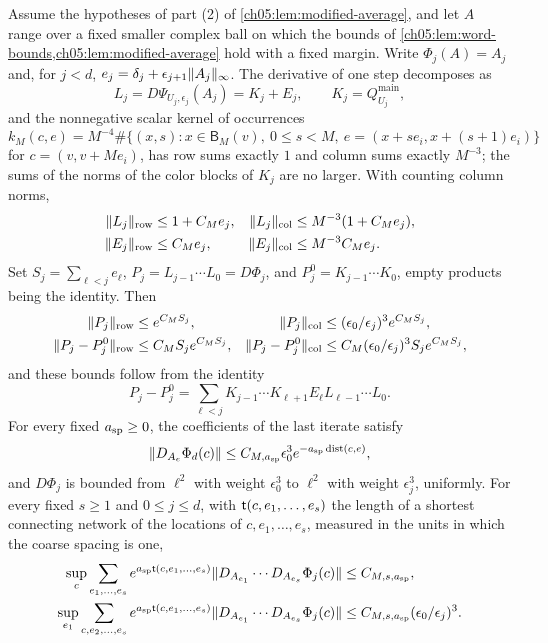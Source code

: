 \begin{lemma}\label{ch05:lem:physical-jets}
Assume the hypotheses of part (2) of \cref{ch05:lem:modified-average}, and let $A$ range over a fixed smaller complex ball on which the bounds of \cref{ch05:lem:word-bounds,ch05:lem:modified-average} hold with a fixed margin. Write $\Phi_j(A)=A_j$ and, for $j<d$, $e_j=\delta_j+\epsilon_{j+1}\lVert A_j\rVert_\infty$. The derivative of one step decomposes as
\[
 L_j=D\Psi_{U_j,\epsilon_j}(A_j)=K_j+E_j,\qquad K_j=Q^{\mathrm{main}}_{U_j},
\]
and the nonnegative scalar kernel of occurrences
\[
 k_M(c,e)=M^{-4}\#\bigl\{(x,s):x\in\mathsf B_M(v),\ 0\le s<M,\ e=(x+se_i,x+(s+1)e_i)\bigr\}
\]
for $c=(v,v+Me_i)$,
has row sums exactly $1$ and column sums exactly $M^{-3}$; the sums of the norms of the color blocks of $K_j$ are no larger. With counting column norms,
\[
 \begin{aligned}
 \lVert L_j\rVert_{\mathrm{row}}&\le1+C_Me_j,&\lVert L_j\rVert_{\mathrm{col}}&\le M^{-3}(1+C_Me_j),\\
 \lVert E_j\rVert_{\mathrm{row}}&\le C_Me_j,&\lVert E_j\rVert_{\mathrm{col}}&\le M^{-3}C_Me_j.
 \end{aligned}
\]
Set $S_j=\sum_{\ell<j}e_\ell$, $P_j=L_{j-1}\cdots L_0=D\Phi_j$, and $P_j^0=K_{j-1}\cdots K_0$, empty products being the identity. Then
\[
 \begin{aligned}
 \lVert P_j\rVert_{\mathrm{row}}&\le e^{C_MS_j},&\lVert P_j\rVert_{\mathrm{col}}&\le(\epsilon_0/\epsilon_j)^3e^{C_MS_j},\\
 \lVert P_j-P_j^0\rVert_{\mathrm{row}}&\le C_MS_je^{C_MS_j},&\lVert P_j-P_j^0\rVert_{\mathrm{col}}&\le C_M(\epsilon_0/\epsilon_j)^3S_je^{C_MS_j},
 \end{aligned}
\]
and these bounds follow from the identity
\[
 P_j-P_j^0=\sum_{\ell<j}K_{j-1}\cdots K_{\ell+1}E_\ell L_{\ell-1}\cdots L_0.
\]
For every fixed $a_{\mathrm{sp}}\ge0$, the coefficients of the last iterate satisfy
\[
 \lVert D_{A_e}\Phi_d(c)\rVert\le C_{M,a_{\mathrm{sp}}}\epsilon_0^3e^{-a_{\mathrm{sp}}\operatorname{dist}(c,e)},
\]
and $D\Phi_j$ is bounded from $\ell^2$ with weight $\epsilon_0^3$ to $\ell^2$ with weight $\epsilon_j^3$, uniformly. For every fixed $s\ge1$ and $0\le j\le d$, with $\mathsf t(c,e_1,\ldots,e_s)$ the length of a shortest connecting network of the locations of $c,e_1,\ldots,e_s$, measured in the units in which the coarse spacing is one,
\[
 \begin{aligned}
 \sup_c\sum_{e_1,\ldots,e_s}e^{\asp\Tree(c,e_1,\ldots,e_s)}\norm{D_{A_{e_1}}\cdots D_{A_{e_s}}\Phi_j(c)}&\le C_{M,s,\asp},\\
 \sup_{e_1}\sum_{c,e_2,\ldots,e_s}e^{\asp\Tree(c,e_1,\ldots,e_s)}\norm{D_{A_{e_1}}\cdots D_{A_{e_s}}\Phi_j(c)}&\le C_{M,s,\asp}(\epsilon_0/\epsilon_j)^3.

\end{aligned}\]
\end{lemma}
